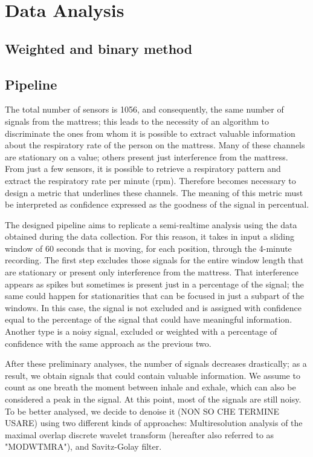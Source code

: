\chapter{Data Analysis}
\section{Weighted and binary method}
\section{Pipeline}
The total number of sensors is 1056, and consequently, the same number of signals from the mattress; this leads to the necessity of an algorithm to discriminate the ones from whom 
it is possible to extract valuable information about the respiratory rate of the person on the mattress.
Many of these channels are stationary on a value; others present just interference from the 
mattress. From just a few sensors, it is possible to retrieve a respiratory pattern and extract the 
respiratory rate per minute (rpm). Therefore becomes necessary to design a metric that underlines these channels.
The meaning of this metric must be interpreted as confidence expressed as the goodness of the signal in percentual.

The designed pipeline aims to replicate a semi-realtime analysis using the data obtained during the data collection. 
For this reason, it takes in input a sliding window of 60 seconds that is moving, for each position, through the 4-minute recording.
The first step excludes those signals for the entire window length that are stationary or present only interference from the mattress.
That interference appears as spikes but sometimes is present just in a percentage of the signal; the same could happen for stationarities that can be focused in just a subpart of the windows. In this case, the signal is not excluded and is assigned with confidence equal to the percentage of the signal that could have meaningful information.
 Another type is a noisy signal, excluded or weighted with a percentage of confidence with the same approach as the previous two.

 After these preliminary analyses, the number of signals decreases drastically; as a result, we obtain signals that could contain valuable information.
We assume to count as one breath the moment between inhale and exhale, which can also be considered a peak in the signal.
At this point, most of the signals are still noisy. To be better analysed, we decide to denoise it (NON SO CHE TERMINE USARE) using 
two different kinds of approaches: Multiresolution analysis of the maximal overlap discrete wavelet transform (hereafter also referred to as "MODWTMRA"), and Savitz-Golay filter.


